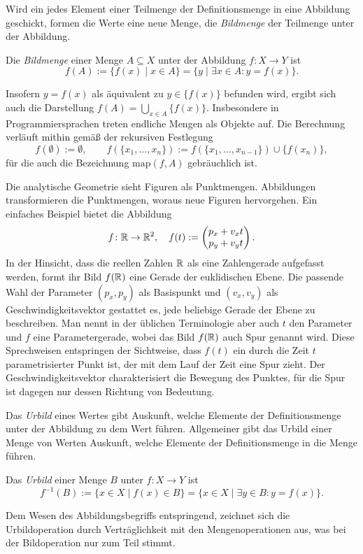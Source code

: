 Wird ein jedes Element einer Teilmenge der Definitionsmenge in eine
Abbildung geschickt, formen die Werte eine neue Menge, die
\emph{Bildmenge} der Teilmenge unter der Abbildung.

\begin{Definition}[Bild]\label{def:Bild}\newlinefirst
Die \emph{Bildmenge} einer Menge $A\subseteq X$ unter der Abbildung
$f\colon X\to Y$ ist
\[f(A) := \{f(x)\mid x\in A\} = \{y\mid\exists x\in A\colon y=f(x)\}.\]
\end{Definition}
Insofern $y=f(x)$ als äquivalent zu $y\in\{f(x)\}$ befunden wird, ergibt
sich auch die Darstellung $f(A) = \bigcup_{x\in A} \{f(x)\}$.
Insbesondere in Programmiersprachen treten endliche Mengen als Objekte
auf. Die Berechnung verläuft mithin gemäß der rekursiven Festlegung%
\[f(\emptyset) := \emptyset,\qquad f(\{x_1,\ldots,x_n\}) :=
f(\{x_1,\ldots,x_{n-1}\})\cup \{f(x_n)\},\]
für die auch die Bezeichnung $\mathrm{map}(f,A)$ gebräuchlich ist.

Die analytische Geometrie sieht Figuren als Punktmengen. Abbildungen
transformieren die Punktmengen, woraus neue Figuren hervorgehen.
Ein einfaches Beispiel bietet die Abbildung%
\[f\colon\mathbb R\to\mathbb R^2,\quad f(t) :=
\begin{pmatrix}p_x + v_x t\\ p_y + v_y t\end{pmatrix}.\]
In der Hinsicht, dass die reellen Zahlen $\mathbb R$ als eine Zahlengerade
aufgefasst werden, formt ihr Bild $f(\mathbb R)$ eine Gerade der euklidischen
Ebene. Die passende Wahl der Parameter $(p_x,p_y)$ als Basispunkt
und $(v_x,v_y)$ als Geschwindigkeitsvektor gestattet es, jede
beliebige Gerade der Ebene zu beschreiben. Man nennt in der üblichen
Terminologie aber auch $t$ den Parameter und $f$ eine Parametergerade,
wobei das Bild $f(\mathbb R)$ auch Spur genannt wird. Diese Sprechweisen
entspringen der Sichtweise, dass $f(t)$ ein durch die Zeit $t$
parametrisierter Punkt ist, der mit dem Lauf der Zeit eine Spur zieht.
Der Geschwindigkeitsvektor charakterisiert die Bewegung des Punktes,
für die Spur ist dagegen nur dessen Richtung von Bedeutung.

Das \emph{Urbild} eines Wertes gibt Auskunft, welche
Elemente der Definitionsmenge unter der Abbildung zu dem Wert führen.
Allgemeiner gibt das Urbild einer Menge von Werten Auskunft, welche
Elemente der Definitionsmenge in die Menge führen.

\begin{Definition}[Urbild]\newlinefirst
Das \emph{Urbild} einer Menge $B$ unter $f\colon X\to Y$ ist
\[f^{-1}(B) := \{x\in X\mid f(x)\in B\} = \{x\in X\mid \exists y\in B\colon y=f(x)\}.\]
\end{Definition}
Dem Wesen des Abbildungsbegriffs entspringend, zeichnet sich die
Urbildoperation durch Verträglichkeit mit den Mengenoperationen aus,
was bei der Bildoperation nur zum Teil stimmt.

